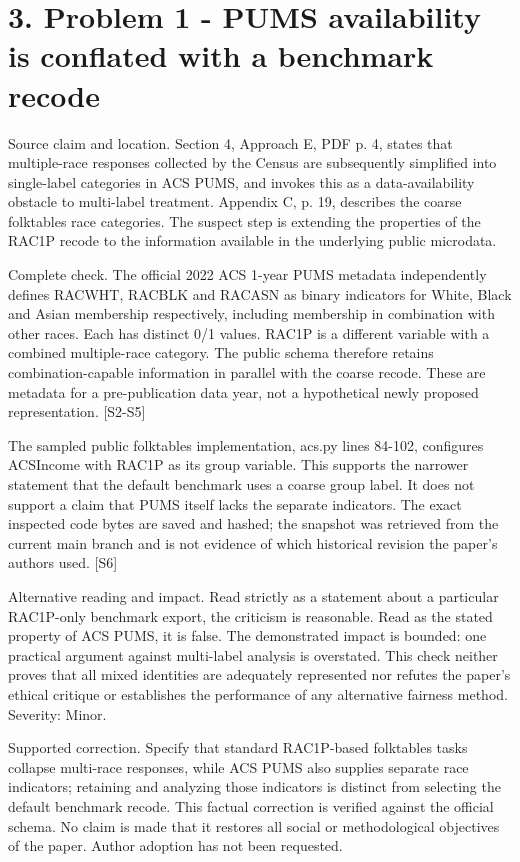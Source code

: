 \documentclass[10pt]{article}
\begin{document}
\section*{3. Problem 1 - PUMS availability is conflated with a benchmark recode}
Source claim and location. Section 4, Approach E, PDF p. 4, states that multiple-race responses collected by the Census are subsequently simplified into single-label categories in ACS PUMS, and invokes this as a data-availability obstacle to multi-label treatment. Appendix C, p. 19, describes the coarse folktables race categories. The suspect step is extending the properties of the RAC1P recode to the information available in the underlying public microdata.\par
Complete check. The official 2022 ACS 1-year PUMS metadata independently defines RACWHT, RACBLK and RACASN as binary indicators for White, Black and Asian membership respectively, including membership in combination with other races. Each has distinct 0/1 values. RAC1P is a different variable with a combined multiple-race category. The public schema therefore retains combination-capable information in parallel with the coarse recode. These are metadata for a pre-publication data year, not a hypothetical newly proposed representation. [S2-S5]\par
The sampled public folktables implementation, acs.py lines 84-102, configures ACSIncome with RAC1P as its group variable. This supports the narrower statement that the default benchmark uses a coarse group label. It does not support a claim that PUMS itself lacks the separate indicators. The exact inspected code bytes are saved and hashed; the snapshot was retrieved from the current main branch and is not evidence of which historical revision the paper’s authors used. [S6]\par
Alternative reading and impact. Read strictly as a statement about a particular RAC1P-only benchmark export, the criticism is reasonable. Read as the stated property of ACS PUMS, it is false. The demonstrated impact is bounded: one practical argument against multi-label analysis is overstated. This check neither proves that all mixed identities are adequately represented nor refutes the paper’s ethical critique or establishes the performance of any alternative fairness method. Severity: Minor.\par
Supported correction. Specify that standard RAC1P-based folktables tasks collapse multi-race responses, while ACS PUMS also supplies separate race indicators; retaining and analyzing those indicators is distinct from selecting the default benchmark recode. This factual correction is verified against the official schema. No claim is made that it restores all social or methodological objectives of the paper. Author adoption has not been requested.\par
\end{document}
